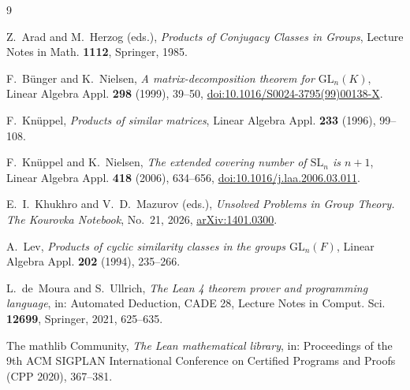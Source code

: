 \documentclass[11pt]{amsart}
\theoremstyle{definition}
\theoremstyle{remark}
\begin{document}
\begin{thebibliography}{9}

Z.~Arad and M.~Herzog (eds.),
\emph{Products of Conjugacy Classes in Groups},
Lecture Notes in Math. \textbf{1112}, Springer, 1985.

F.~B\"unger and K.~Nielsen,
\emph{A matrix-decomposition theorem for $\mathrm{GL}_n(K)$},
Linear Algebra Appl. \textbf{298} (1999), 39--50,
\href{https://doi.org/10.1016/S0024-3795(99)00138-X}{doi:10.1016/S0024-3795(99)00138-X}.

F.~Kn\"uppel,
\emph{Products of similar matrices},
Linear Algebra Appl. \textbf{233} (1996), 99--108.

F.~Kn\"uppel and K.~Nielsen,
\emph{The extended covering number of $\mathrm{SL}_n$ is $n+1$},
Linear Algebra Appl. \textbf{418} (2006), 634--656,
\href{https://doi.org/10.1016/j.laa.2006.03.011}{doi:10.1016/j.laa.2006.03.011}.

E.~I.~Khukhro and V.~D.~Mazurov (eds.),
\emph{Unsolved Problems in Group Theory. The Kourovka Notebook}, No.~21, 2026,
\href{https://arxiv.org/abs/1401.0300}{arXiv:1401.0300}.

A.~Lev,
\emph{Products of cyclic similarity classes in the groups $\mathrm{GL}_n(F)$},
Linear Algebra Appl. \textbf{202} (1994), 235--266.

L.~de~Moura and S.~Ullrich,
\emph{The Lean 4 theorem prover and programming language},
in: Automated Deduction, CADE 28, Lecture Notes in Comput. Sci. \textbf{12699}, Springer, 2021,
625--635.

The mathlib Community,
\emph{The Lean mathematical library},
in: Proceedings of the 9th ACM SIGPLAN International Conference on Certified Programs and
Proofs (CPP 2020), 367--381.

\end{thebibliography}
\end{document}

